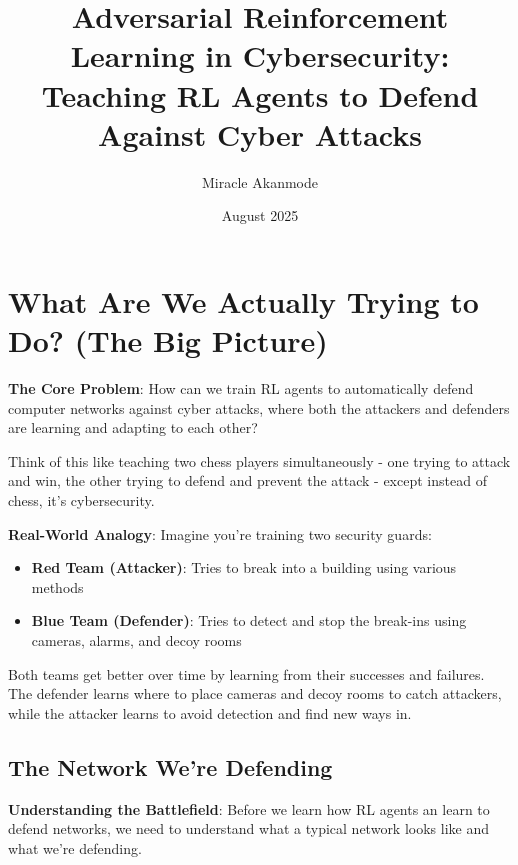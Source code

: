 \documentclass[11pt]{article}
\title{Adversarial Reinforcement Learning in Cybersecurity: Teaching RL Agents to Defend Against Cyber Attacks}
\author{Miracle Akanmode}
\date{August 2025}
\begin{document}
\maketitle

\tableofcontents

\section{What Are We Actually Trying to Do? (The Big Picture)}

\begin{foundation}
\textbf{The Core Problem}: How can we train RL agents to automatically defend computer networks against cyber attacks, where both the attackers and defenders are learning and adapting to each other?

Think of this like teaching two chess players simultaneously - one trying to attack and win, the other trying to defend and prevent the attack - except instead of chess, it's cybersecurity.

\end{foundation}

\begin{intuition}
\textbf{Real-World Analogy}: Imagine you're training two security guards:
\begin{itemize}
\item \textbf{Red Team (Attacker)}: Tries to break into a building using various methods
\item \textbf{Blue Team (Defender)}: Tries to detect and stop the break-ins using cameras, alarms, and decoy rooms
\end{itemize}

Both teams get better over time by learning from their successes and failures. The defender learns where to place cameras and decoy rooms to catch attackers, while the attacker learns to avoid detection and find new ways in.
\end{intuition}

\subsection{The Network We're Defending}

\begin{foundation}
\textbf{Understanding the Battlefield}: Before we learn how RL agents an learn to defend networks, we need to understand what a typical network looks like and what we're defending.
\end{foundation}
\end{document}
